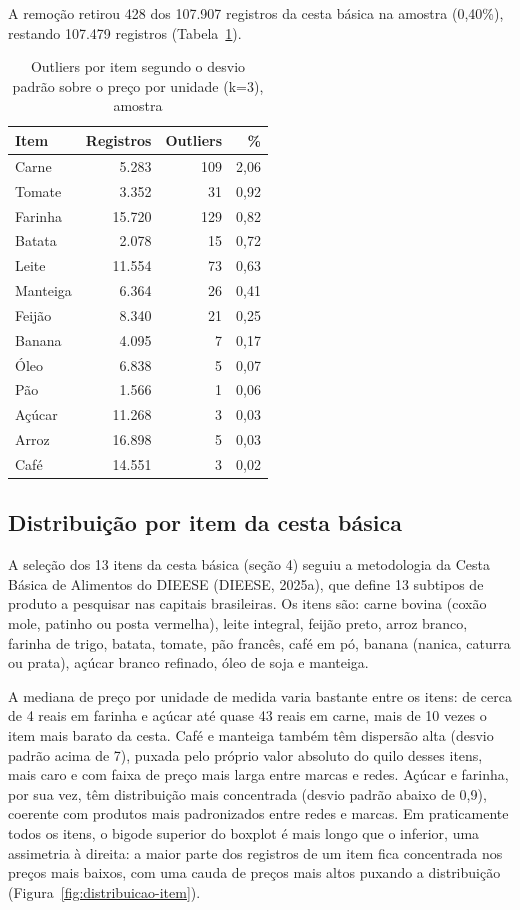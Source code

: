 \documentclass[11pt,a4paper]{article}
\begin{document}
A remoção retirou 428 dos 107.907 registros da cesta básica na amostra (0,40\%), restando 107.479 registros (Tabela~\ref{tab:outliers-item}).

\begin{table}[H]
\caption{Outliers por item segundo o desvio padrão sobre o preço por unidade (k=3), amostra}
\label{tab:outliers-item}
\small
\centering
\begin{tabular}{@{}lrrr@{}}
\toprule
\textbf{Item} & \textbf{Registros} & \textbf{Outliers} & \textbf{\%} \\
\midrule
Carne & 5.283 & 109 & 2,06 \\
Tomate & 3.352 & 31 & 0,92 \\
Farinha & 15.720 & 129 & 0,82 \\
Batata & 2.078 & 15 & 0,72 \\
Leite & 11.554 & 73 & 0,63 \\
Manteiga & 6.364 & 26 & 0,41 \\
Feijão & 8.340 & 21 & 0,25 \\
Banana & 4.095 & 7 & 0,17 \\
Óleo & 6.838 & 5 & 0,07 \\
Pão & 1.566 & 1 & 0,06 \\
Açúcar & 11.268 & 3 & 0,03 \\
Arroz & 16.898 & 5 & 0,03 \\
Café & 14.551 & 3 & 0,02 \\
\bottomrule
\end{tabular}
\end{table}

\subsection{Distribuição por item da cesta básica}

A seleção dos 13 itens da cesta básica (seção 4) seguiu a metodologia da Cesta Básica de Alimentos do DIEESE (DIEESE, 2025a), que define 13 subtipos de produto a pesquisar nas capitais brasileiras. Os itens são: carne bovina (coxão mole, patinho ou posta vermelha), leite integral, feijão preto, arroz branco, farinha de trigo, batata, tomate, pão francês, café em pó, banana (nanica, caturra ou prata), açúcar branco refinado, óleo de soja e manteiga.

A mediana de preço por unidade de medida varia bastante entre os itens: de cerca de 4 reais em farinha e açúcar até quase 43 reais em carne, mais de 10 vezes o item mais barato da cesta. Café e manteiga também têm dispersão alta (desvio padrão acima de 7), puxada pelo próprio valor absoluto do quilo desses itens, mais caro e com faixa de preço mais larga entre marcas e redes. Açúcar e farinha, por sua vez, têm distribuição mais concentrada (desvio padrão abaixo de 0,9), coerente com produtos mais padronizados entre redes e marcas. Em praticamente todos os itens, o bigode superior do boxplot é mais longo que o inferior, uma assimetria à direita: a maior parte dos registros de um item fica concentrada nos preços mais baixos, com uma cauda de preços mais altos puxando a distribuição (Figura~\ref{fig:distribuicao-item}).
\end{document}

